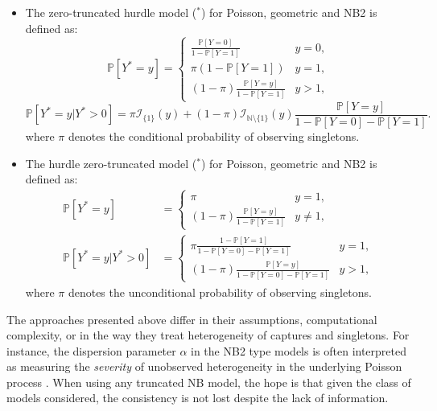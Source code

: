 \documentclass[nojss]{jss}
\newcommand{\1}{\mathcal{I}} \newcommand{\bZero}{\boldsymbol{0}}
\begin{document}
\begin{itemize}
    \item The zero-truncated hurdle model ($^\ast$) for Poisson, geometric and NB2 is defined as:
    \begin{equation*}
        \mathbb{P}\left[Y^{\ast}=y\right]=\begin{cases}
        \frac{\mathbb{P}[Y=0]}{1-\mathbb{P}[Y=1]} & y=0, \\
        \pi(1-\mathbb{P}[Y=1]) & y=1, \\
        (1-\pi) \frac{\mathbb{P}[Y=y]}{1-\mathbb{P}[Y=1]} & y>1,
        \end{cases}
    \end{equation*}
    \begin{equation*}
        \mathbb{P}\left[Y^{\ast}=y|Y^{\ast}>0\right]=\pi\mathcal{I}_{\{1\}}(y)+
        (1-\pi)\mathcal{I}_{\mathbb{N}\setminus\{1\}}(y)\frac{\mathbb{P}[Y=y]}{1-\mathbb{P}[Y=0]-\mathbb{P}[Y=1]}.
    \end{equation*}
    where $\pi$ denotes the conditional probability of observing singletons.
    \item The hurdle zero-truncated model ($^\ast$) for Poisson, geometric and NB2 is defined as:
    \begin{align*}
        \mathbb{P}\left[Y^{\ast}=y\right]&=\begin{cases}
        \pi & y=1, \\
        (1-\pi) \frac{\mathbb{P}[Y=y]}{1-\mathbb{P}[Y=1]} & y\neq1,
        \end{cases}\\
        \mathbb{P}\left[Y^{\ast}=y|Y^{\ast}>0\right]&=\begin{cases}
            \pi\frac{1-\mathbb{P}[Y=1]}{1-\mathbb{P}[Y=0]-\mathbb{P}[Y=1]} & y=1,\\
            (1-\pi)\frac{\mathbb{P}[Y=y]}{1-\mathbb{P}[Y=0]-\mathbb{P}[Y=1]} & y>1,
        \end{cases}
    \end{align*}
    where $\pi$ denotes the unconditional probability of observing singletons.
\end{itemize}

The approaches presented above differ in their assumptions,
computational complexity, or in the way they treat heterogeneity of
captures and singletons. For instance, the dispersion parameter
\(\alpha\) in the NB2 type models is often interpreted as measuring the
\textit{severity} of unobserved heterogeneity in the underlying Poisson
process \citep[cf.][]{ztnegbin}. When using any truncated NB model, the
hope is that given the class of models considered, the consistency is
not lost despite the lack of information.
\end{document}
